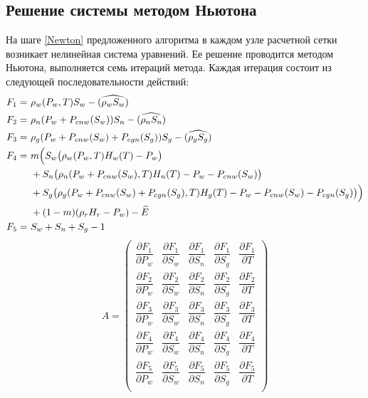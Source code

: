 \newpage
\subsection{Решение системы методом Ньютона} На шаге \ref{Newton}
предложенного алгоритма в каждом узле расчетной сетки возникает 
нелинейная система уравнений.
Ее решение проводится методом Ньютона\cite{Kalitkin}, выполняется семь
итераций метода. Каждая итерация 
состоит из следующей последовательности действий:
\begin{eqnarray*}
  \begin{aligned}
    F_1=\ &\rho_w(P_w, T) S_w - (\widehat{\rho_w S_w}) \\
    F_2=\ &\rho_n(P_w+P_{cnw}(S_w)) S_n - (\widehat{\rho_n S_n}) \\
    F_3=\ &\rho_g(P_w+P_{cnw}(S_w)+P_{cgn}(S_g)) S_g - (\widehat{\rho_g S_g}) \\
    F_4=\ & m \Big{(}S_w \big{(}\rho_w(P_w, T) H_w(T) - P_w\big{)} \\
	 &+ S_n \big{(}\rho_n(P_w+P_{cnw}(S_w), T) H_n(T) - P_w - P_{cnw}(S_w)\big{)} \\
	 &+ S_g \big{(}\rho_g(P_w+P_{cnw}(S_w)+P_{cgn}(S_g), T) H_g(T) - P_w - P_{cnw}(S_w) - P_{cgn}(S_g)\big{)}
	 \Big{)}\\
	 &+ (1-m) (\rho_r H_r - P_w) - \widehat{E} \\
    F_5=\ &S_w+S_n+S_g - 1
  \end{aligned}
\end{eqnarray*}
\begin{equation}
A=
\begin{pmatrix}
\dfrac{\partial{F_1}}{\partial{P_w}} & \dfrac{\partial{F_1}}{\partial{S_w}} & \dfrac{\partial{F_1}}{\partial{S_n}} & \dfrac{\partial{F_1}}{\partial{S_g}} & \dfrac{\partial{F_1}}{\partial{T}}\\[3mm]
\dfrac{\partial{F_2}}{\partial{P_w}} & \dfrac{\partial{F_2}}{\partial{S_w}} & \dfrac{\partial{F_2}}{\partial{S_n}} & \dfrac{\partial{F_2}}{\partial{S_g}} & \dfrac{\partial{F_2}}{\partial{T}}\\[3mm]
\dfrac{\partial{F_3}}{\partial{P_w}} & \dfrac{\partial{F_3}}{\partial{S_w}} & \dfrac{\partial{F_3}}{\partial{S_n}} & \dfrac{\partial{F_3}}{\partial{S_g}} & \dfrac{\partial{F_3}}{\partial{T}}\\[3mm]
\dfrac{\partial{F_4}}{\partial{P_w}} & \dfrac{\partial{F_4}}{\partial{S_w}} & \dfrac{\partial{F_4}}{\partial{S_n}} & \dfrac{\partial{F_4}}{\partial{S_g}} & \dfrac{\partial{F_4}}{\partial{T}}\\[3mm]
\dfrac{\partial{F_5}}{\partial{P_w}} & \dfrac{\partial{F_5}}{\partial{S_w}} & \dfrac{\partial{F_5}}{\partial{S_n}} & \dfrac{\partial{F_5}}{\partial{S_g}} & \dfrac{\partial{F_5}}{\partial{T}}\\[3mm]
\end{pmatrix}
\end{equation}

